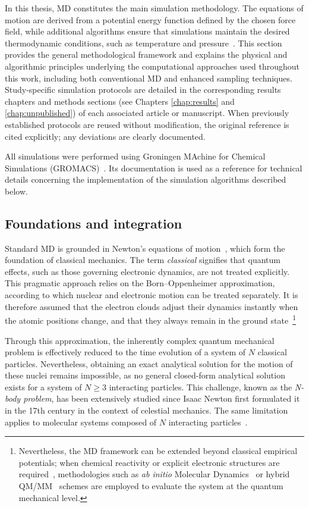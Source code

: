 In this thesis, MD constitutes the main simulation methodology. The equations of motion are derived from a potential energy function defined by the chosen force field, while additional algorithms ensure that simulations maintain the desired thermodynamic conditions, such as temperature and pressure~\cite{braun2018best}. This section provides the general methodological framework and explains the physical and algorithmic principles underlying the computational approaches used throughout this work, including both conventional MD and enhanced sampling techniques. Study-specific simulation protocols are detailed in the corresponding results chapters and methods sections (see Chapters \ref{chap:results} and \ref{chap:unpublished}) of each associated article or manuscript. When previously established protocols are reused without modification, the original reference is cited explicitly; any deviations are clearly documented.

All simulations were performed using Groningen MAchine for Chemical Simulations (GROMACS)~\cite{Gromacs2015}. Its documentation is used as a reference for technical details concerning the implementation of the simulation algorithms described below.



\subsection{Foundations and integration}

Standard MD is grounded in Newton's equations of motion~\cite{leyesnewton}, which form the foundation of classical mechanics. The term \emph{classical} signifies that quantum effects, such as those governing electronic dynamics, are not treated explicitly. This pragmatic approach relies on the Born–Oppenheimer approximation, according to which nuclear and electronic motion can be treated separately. It is therefore assumed that the electron clouds adjust their dynamics instantly when the atomic positions change, and that they always remain in the ground state~\cite{born1927quantentheorie}\footnote{Nevertheless, the MD framework can be extended beyond classical empirical potentials; when chemical reactivity or explicit electronic structures are required~\cite{vennelakanti2022harder, ahmadi2018multiscale}, methodologies such as \emph{ab initio} Molecular Dynamics~\cite{car1985unified} or hybrid QM/MM~\cite{WARSHEL1976227} schemes are employed to evaluate the system at the quantum mechanical level.}

Through this approximation, the inherently complex quantum mechanical problem is effectively reduced to the time evolution of a system of \(N\) classical particles. Nevertheless, obtaining an exact analytical solution for the motion of these nuclei remains impossible, as no general closed-form analytical solution exists for a system of \(N \geq 3\) interacting particles. This challenge, known as the \emph{N-body problem}, has been extensively studied since Isaac Newton first formulated it in the 17th century in the context of celestial mechanics. The same limitation applies to molecular systems composed of \(N\) interacting particles~\cite{n-body}.

